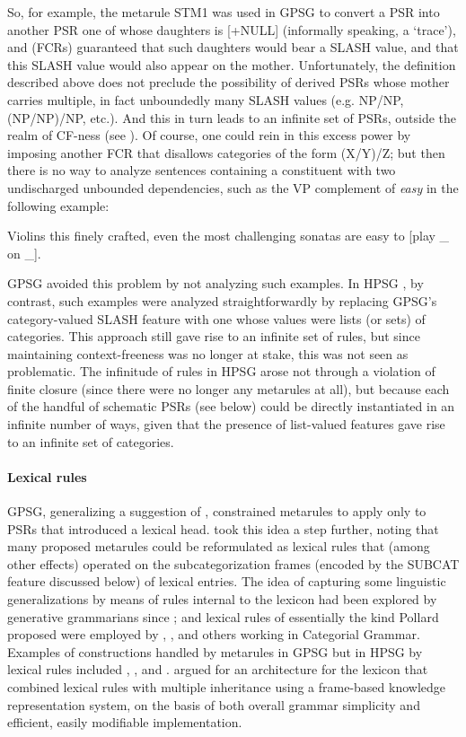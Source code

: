 \documentclass[output=paper]{langsci/langscibook}
\begin{document}
So, for example, the metarule STM1 was used in GPSG to convert a PSR into another PSR one of whose daughters is [+NULL] (informally speaking, a `trace'), and  (FCRs) guaranteed that such daughters would bear a SLASH value, and that this SLASH value would also appear on the mother. Unfortunately, the  definition described above does not preclude the possibility of derived PSRs whose mother carries multiple, in fact unboundedly many
SLASH values (e.g. NP/NP, (NP/NP)/NP, etc.). And this in turn leads to an infinite set of PSRs, outside the realm of CF-ness (see \citet{Ristad86}).  Of course, one could rein in this excess power by imposing another FCR that disallows categories of the form (X/Y)/Z; but then there is no way to analyze sentences containing a constituent with two undischarged unbounded dependencies, such as the VP complement of \emph{easy} in the following example:

\ea
\label{ex-violins}
Violins this finely crafted, even the most challenging sonatas are easy to [play \_ on \_].
\z

\noindent
GPSG avoided this problem by not analyzing such examples. In HPSG \citep{Pollard85a-u}, by contrast, such examples were analyzed straightforwardly by replacing GPSG's category-valued SLASH feature with one whose values were lists (or sets) of categories. This approach still gave rise to an infinite set of rules, but since maintaining context-freeness was no longer at stake, this was not seen as problematic. The infinitude of rules in HPSG arose not through a violation of finite closure (since there were no longer any metarules at all), but because each of the handful of schematic PSRs (see below) could be directly instantiated in an infinite number of ways, given that the presence of list-valued
features gave rise to an infinite set of categories.

\paragraph*{Lexical rules} GPSG, generalizing a suggestion of \citet{Flickinger1983}, constrained metarules to apply only to PSRs that introduced a lexical head. \citet{Pollard85a-u} took this idea a step further, noting that many proposed metarules could be reformulated as lexical rules that (among other effects) operated on the subcategorization frames (encoded by the SUBCAT feature discussed below) of lexical entries. The idea of capturing some linguistic generalizations by means of rules internal to the lexicon had been explored by generative grammarians since \citet{Jackendoff75a}; and lexical rules of essentially the kind Pollard proposed were employed by \citet{Bach83}, \citet{Dowty78a}, and others working in Categorial Grammar. Examples of constructions handled by metarules in GPSG but in HPSG by lexical rules included , , and . \citet*{FPW85a} argued for an architecture for the lexicon that combined lexical rules with multiple inheritance using a frame-based knowledge representation system, on the basis of both overall grammar simplicity and efficient, easily modifiable implementation.
\end{document}
